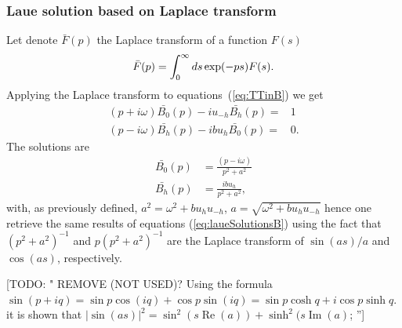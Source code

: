 \documentclass[preprint]{iucr}              %
\newcommand{\todo}[1]{{\color{red}[TODO: "#1'']}}
\newcommand{\inred}[1]{{\color{red}#1}}
\begin{document}
\subsubsection{Laue solution based on Laplace transform}
\label{sec:laplaceLaue}
Let denote $\bar{F}(p)$ the Laplace transform of a function $F(s)$
\begin{equation}
\Bar{F}(p) = \int_0^\infty ds \exp(-p s) F(s).
\end{equation}
Applying the Laplace transform to equations~(\ref{eq:TTinB}) we get
\begin{subequations}
\label{eq:TTlaueLaplace}
\begin{align}
(p + i \omega) \bar{B_0}(p) - i u_{-h} \bar{B_h}(p)= & 1 \\
(p - i \omega) \bar{B_h}(p) - i b u_{h} \bar{B_0}(p)= & 0.
\end{align}
\end{subequations}
The solutions are
\begin{subequations}
\begin{align}
\bar{B_0}(p) &= \frac{(p - i \omega) }{p^2 + a^2} \\
\bar{B_h}(p) &= \frac{i b u_h}{p^2 + a^2},
\end{align}
\end{subequations}
with, \inred{as previously defined,} $a^2=\omega^2 + b u_h u_{-h}$, $a=\sqrt{\omega^2+b u_h u_{-h}}$
hence one retrieve the same results of equations (\ref{eq:laueSolutionsB}) using the fact that  $(p^2+a^2)^{-1}$ and $p(p^2+a^2)^{-1}$ are the Laplace transform of \inred{ $\sin(a s)/a$ and $\cos(a s)$}, respectively. 

\todo{ REMOVE (NOT USED)? Using the formula $\sin(p+i q)=\sin p \cos(i q) + \cos p \sin(i q)=\sin p \cosh q + i \cos p \sinh q$. it is shown that $|\sin(a s)|^2=\sin^2(s \operatorname{Re}(a)) + \sinh^2(s \operatorname{Im}(a)$;
}
\end{document}
